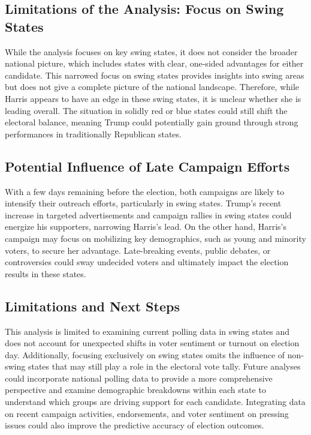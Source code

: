 \documentclass[
  letterpaper,
  DIV=11,
  numbers=noendperiod]{scrartcl}
\begin{document}
\hypertarget{limitations-of-the-analysis-focus-on-swing-states}{%
\subsection{Limitations of the Analysis: Focus on Swing
States}\label{limitations-of-the-analysis-focus-on-swing-states}}

While the analysis focuses on key swing states, it does not consider the
broader national picture, which includes states with clear, one-sided
advantages for either candidate. This narrowed focus on swing states
provides insights into swing areas but does not give a complete picture
of the national landscape. Therefore, while Harris appears to have an
edge in these swing states, it is unclear whether she is leading
overall. The situation in solidly red or blue states could still shift
the electoral balance, meaning Trump could potentially gain ground
through strong performances in traditionally Republican states.

\hypertarget{potential-influence-of-late-campaign-efforts}{%
\subsection{Potential Influence of Late Campaign
Efforts}\label{potential-influence-of-late-campaign-efforts}}

With a few days remaining before the election, both campaigns are likely
to intensify their outreach efforts, particularly in swing states.
Trump's recent increase in targeted advertisements and campaign rallies
in swing states could energize his supporters, narrowing Harris's lead.
On the other hand, Harris's campaign may focus on mobilizing key
demographics, such as young and minority voters, to secure her
advantage. Late-breaking events, public debates, or controversies could
sway undecided voters and ultimately impact the election results in
these states.

\hypertarget{limitations-and-next-steps}{%
\subsection{Limitations and Next
Steps}\label{limitations-and-next-steps}}

This analysis is limited to examining current polling data in swing
states and does not account for unexpected shifts in voter sentiment or
turnout on election day. Additionally, focusing exclusively on swing
states omits the influence of non-swing states that may still play a
role in the electoral vote tally. Future analyses could incorporate
national polling data to provide a more comprehensive perspective and
examine demographic breakdowns within each state to understand which
groups are driving support for each candidate. Integrating data on
recent campaign activities, endorsements, and voter sentiment on
pressing issues could also improve the predictive accuracy of election
outcomes.
\end{document}
